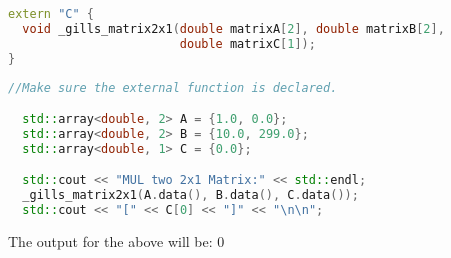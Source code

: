 \documentclass{article}
\begin{document}
\begin{lstlisting}[language=C++, frame=single]
extern "C" {
  void _gills_matrix2x1(double matrixA[2], double matrixB[2], 
                        double matrixC[1]);
}
\end{lstlisting}

\begin{lstlisting}[language=C++, frame=single]
  //Make sure the external function is declared.

  std::array<double, 2> A = {1.0, 0.0};
  std::array<double, 2> B = {10.0, 299.0};
  std::array<double, 1> C = {0.0};

  std::cout << "MUL two 2x1 Matrix:" << std::endl;
  _gills_matrix2x1(A.data(), B.data(), C.data());
  std::cout << "[" << C[0] << "]" << "\n\n";
\end{lstlisting}

\noindent The output for the above will be: $0$ \\
\end{document}
